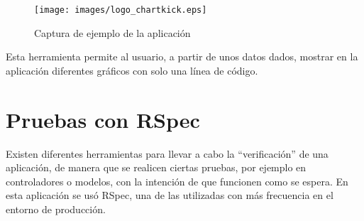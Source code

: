 \begin{figure}[!th]
\begin{center}
\texttt{[image: images/logo\_chartkick.eps]}
\caption{Captura de ejemplo de la aplicación}
\label{fig:8}
\end{center}
\end{figure}

Esta herramienta permite al usuario, a partir de unos datos dados, mostrar en la aplicación diferentes gráficos con solo una línea de código.


\section{Pruebas con RSpec}
\label{3:sec:6}

Existen diferentes herramientas para llevar a cabo la ``verificación'' de una aplicación, de manera que se realicen ciertas pruebas, por ejemplo en controladores o modelos, con la intención de que funcionen como se espera. En esta aplicación se usó RSpec\cite{RSpec}, una de las utilizadas con más frecuencia en el entorno de producción.
